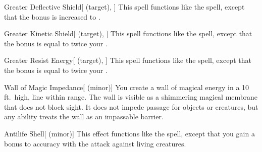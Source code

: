 \lowercase{\hypertarget{spell:Greater Deflective Shield}{}}\label{spell:Greater Deflective Shield}
\begin{attuneability}[\nth{4}]{\hypertarget{spell:Greater Deflective Shield}{Greater Deflective Shield}}[ (target), ]
This spell functions like the  spell, except that the bonus is increased to .
\end{attuneability}
\vspace{0.25em}



\lowercase{\hypertarget{spell:Greater Kinetic Shield}{}}\label{spell:Greater Kinetic Shield}
\begin{attuneability}[\nth{4}]{\hypertarget{spell:Greater Kinetic Shield}{Greater Kinetic Shield}}[ (target), ]
This spell functions like the  spell, except that the bonus is equal to twice your .
\end{attuneability}
\vspace{0.25em}



\lowercase{\hypertarget{spell:Greater Resist Energy}{}}\label{spell:Greater Resist Energy}
\begin{attuneability}[\nth{4}]{\hypertarget{spell:Greater Resist Energy}{Greater Resist Energy}}[ (target), ]
This spell functions like the  spell, except that the bonus is equal to twice your .
\end{attuneability}
\vspace{0.25em}



\lowercase{\hypertarget{spell:Wall of Magic Impedance}{}}\label{spell:Wall of Magic Impedance}
\begin{freeability}[\nth{4}]{\hypertarget{spell:Wall of Magic Impedance}{Wall of Magic Impedance}}[ (minor)]
You create a wall of magical energy in a 10 ft.\ high, \areamed line within \rngmed range.
The wall is visible as a shimmering magical membrane that does not block sight.
It does not impede passage for objects or creatures, but any  ability treats the wall as an impassable barrier.
\end{freeability}
\vspace{0.25em}



\lowercase{\hypertarget{spell:Antilife Shell}{}}\label{spell:Antilife Shell}
\begin{freeability}[\nth{5}]{\hypertarget{spell:Antilife Shell}{Antilife Shell}}[ (minor)]
This effect functions like the  spell, except that you gain a  bonus to accuracy with the attack against living creatures.
\end{freeability}
\vspace{0.25em}



